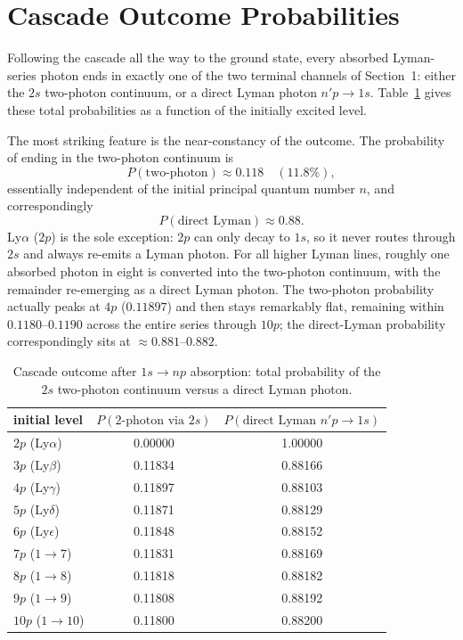 \documentclass[english,a4paper]{my_memo}
\begin{document}
\section{Cascade Outcome Probabilities}
\label{sec:cascade}

Following the cascade all the way to the ground state, every absorbed
Lyman-series photon ends in exactly one of the two terminal channels of
Section~1: either the $2s$ two-photon continuum, or a direct Lyman photon
$n'p \to 1s$.  Table~\ref{tab:outcome} gives these total probabilities as a
function of the initially excited level.

The most striking feature is the near-constancy of the outcome.  The
probability of ending in the two-photon continuum is
\begin{equation}
   P(\text{two-photon}) \approx 0.118 \quad (11.8\%) ,
\end{equation}
essentially independent of the initial principal quantum number $n$, and
correspondingly
\begin{equation}
   P(\text{direct Lyman}) \approx 0.88 .
\end{equation}
Ly$\alpha$ ($2p$) is the sole exception: $2p$ can only decay to $1s$, so it
never routes through $2s$ and always re-emits a Lyman photon.  For all
higher Lyman lines, roughly one absorbed photon in eight is converted into
the two-photon continuum, with the remainder re-emerging as a direct Lyman
photon.  The two-photon probability actually peaks at $4p$ ($0.11897$) and
then stays remarkably flat, remaining within $0.1180$--$0.1190$ across the
entire series through $10p$; the direct-Lyman probability correspondingly
sits at $\approx 0.881$--$0.882$.

\begin{table}[htb]
\centering
\caption{Cascade outcome after $1s \to np$ absorption: total probability of
the $2s$ two-photon continuum versus a direct Lyman photon.}
\label{tab:outcome}
\small
\begin{tabular}{l c c}
\toprule
initial level & $P(\text{2-photon via } 2s)$ & $P(\text{direct Lyman } n'p \to 1s)$ \\
\midrule
$2p$  (Ly$\alpha$)   & 0.00000 & 1.00000 \\
$3p$  (Ly$\beta$)    & 0.11834 & 0.88166 \\
$4p$  (Ly$\gamma$)   & 0.11897 & 0.88103 \\
$5p$  (Ly$\delta$)   & 0.11871 & 0.88129 \\
$6p$  (Ly$\epsilon$) & 0.11848 & 0.88152 \\
$7p$  ($1 \to 7$)    & 0.11831 & 0.88169 \\
$8p$  ($1 \to 8$)    & 0.11818 & 0.88182 \\
$9p$  ($1 \to 9$)    & 0.11808 & 0.88192 \\
$10p$ ($1 \to 10$)   & 0.11800 & 0.88200 \\
\bottomrule
\end{tabular}
\end{table}
\end{document}
